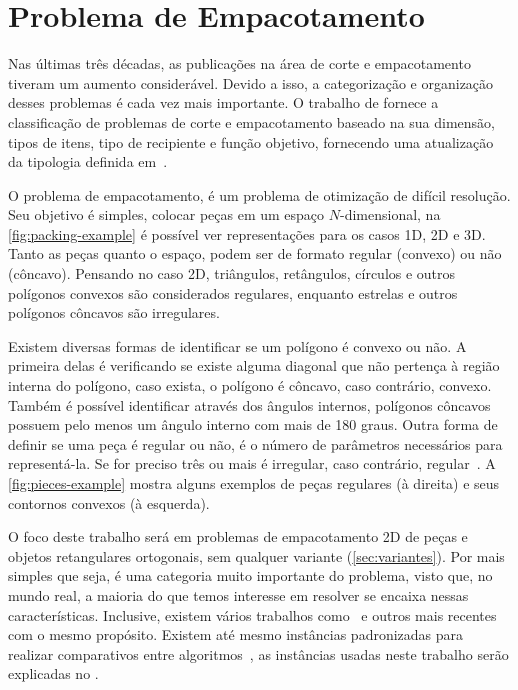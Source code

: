 \chapter{Problema de Empacotamento}\label{ch:problema-de-empacotamento}

Nas últimas três décadas, as publicações na área de corte e empacotamento tiveram um aumento
considerável.
Devido a isso, a categorização e organização desses problemas é cada vez mais importante.
O trabalho de \citeauthor*{wascher2007improved} fornece a classificação de problemas de corte e
empacotamento baseado na sua dimensão, tipos de itens, tipo de recipiente e função objetivo,
fornecendo uma atualização da tipologia definida em~\cite{dyckhoff1990typology}.

O problema de empacotamento, é um problema de otimização de difícil resolução.
Seu objetivo é simples, colocar peças em um espaço $N$-dimensional, na \autoref{fig:packing-example}
é possível ver representações para os casos 1D, 2D e 3D\@.
Tanto as peças quanto o espaço, podem ser de formato regular (convexo) ou não (côncavo).
Pensando no caso 2D, triângulos, retângulos, círculos e outros polígonos convexos são
considerados regulares, enquanto estrelas e outros polígonos côncavos são irregulares.

Existem diversas formas de identificar se um polígono é convexo ou não.
A primeira delas é verificando se existe alguma diagonal que não pertença à região interna do
polígono, caso exista, o polígono é côncavo, caso contrário, convexo.
Também é possível identificar através dos ângulos internos, polígonos côncavos possuem pelo menos
um ângulo interno com mais de 180 graus.
Outra forma de definir se uma peça é regular ou não, é o número de parâmetros necessários
para representá-la.
Se for preciso três ou mais é irregular, caso contrário, regular~\cite{aprendizado-reforco}.
A \autoref{fig:pieces-example} mostra alguns exemplos de peças regulares (à direita) e seus
contornos convexos (à esquerda).



O foco deste trabalho será em problemas de empacotamento 2D de peças e objetos retangulares
ortogonais, sem qualquer variante (\autoref{sec:variantes}).
Por mais simples que seja, é uma categoria muito importante do problema, visto que, no mundo real,
a maioria do que temos interesse em resolver se encaixa nessas características.
Inclusive, existem vários trabalhos como~\cite{wei2011skyline} e outros mais recentes~\cite{
    martin2020models,firat2020effective,chen2019efficient} com o mesmo propósito.
Existem até mesmo instâncias padronizadas para realizar comparativos entre algoritmos~\cite{
    2DPackLib}, as instâncias usadas neste trabalho serão explicadas no .

